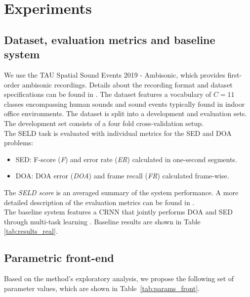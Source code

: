 
\section{Experiments}
\label{sec:expe}

\subsection{Dataset, evaluation metrics and baseline system}
\label{ssec:dataset}
We use the TAU Spatial Sound Events 2019 - Ambisonic, which provides first-order ambisonic recordings.
Details about the recording format and dataset specifications can be found in \cite{Adavanne2019_DCASE}.
The dataset features a vocabulary of $C=11$ classes encompassing human sounds and sound events typically found in indoor office environments.
The dataset is split into a development and evaluation sets. 
The development set consists of a four fold cross-validation setup.\\

The SELD task is evaluated with individual metrics for the SED and DOA problems:
\begin{itemize}
	\item SED: F-score (\textit{F}) and error rate (\textit{ER}) calculated in one-second segments.
	\item DOA: DOA error (\textit{DOA}) and frame recall (\textit{FR}) calculated frame-wise.
\end{itemize}
The \textit{SELD score} is an averaged summary of the system performance.
A more detailed description of the evaluation metrics can be found in \cite{Adavanne2018_JSTSP}.\\

The baseline system features a CRNN that jointly performs DOA and SED through multi-task learning \cite{Adavanne2018_JSTSP}.
Baseline results are shown in Table \ref{tab:results_real}.


\subsection{Parametric front-end}
\label{ssec:param_frontend}

Based on the method's exploratory analysis, we propose the following set of parameter values, which are shown in Table~\ref{tab:params_front}.


